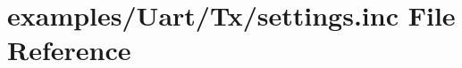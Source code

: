 \hypertarget{examples_2Uart_2Tx_2settings_8inc}{}\section{examples/\+Uart/\+Tx/settings.inc File Reference}
\label{examples_2Uart_2Tx_2settings_8inc}
